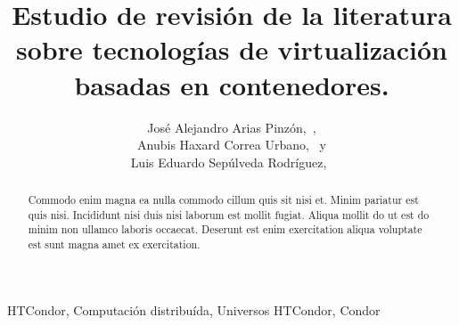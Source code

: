 \documentclass[]{IEEEtran}
\begin{document}
\renewcommand{\thesection}{\arabic{section}}
\renewcommand{\thesubsection}{\thesection.\arabic{subsection}}
\renewcommand{\thesubsubsection}{\thesubsection.\arabic{subsubsection}}

\title{
    Estudio de revisión de la literatura sobre tecnologías de virtualización basadas en contenedores.
}

\author{
    José Alejandro Arias Pinzón,~, \\
    Anubis Haxard Correa Urbano,~ y \\
    Luis Eduardo Sepúlveda Rodríguez,~
}



\maketitle

\begin{abstract}
Commodo enim magna ea nulla commodo cillum quis sit nisi et. Minim pariatur est quis nisi. Incididunt nisi duis nisi laborum est mollit fugiat. Aliqua mollit do ut est do minim non ullamco laboris occaecat. Deserunt est enim exercitation aliqua voluptate est sunt magna amet ex exercitation.
\end{abstract}


\begin{IEEEkeywords}
HTCondor, Computación distribuída, Universos HTCondor, Condor
\end{IEEEkeywords}















%




\end{document}
